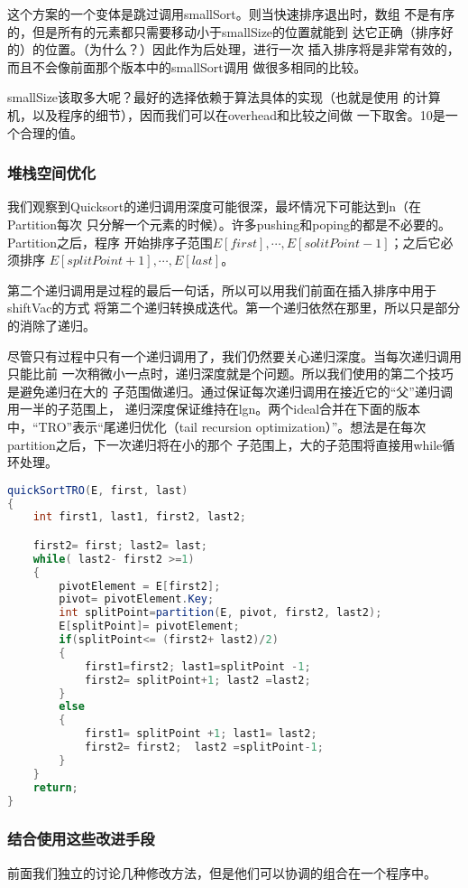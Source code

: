 这个方案的一个变体是跳过调用smallSort。则当快速排序退出时，数组
不是有序的，但是所有的元素都只需要移动小于smallSize的位置就能到
达它正确（排序好的）的位置。（为什么？）因此作为后处理，进行一次
插入排序将是非常有效的，而且不会像前面那个版本中的smallSort调用
做很多相同的比较。

smallSize该取多大呢？最好的选择依赖于算法具体的实现（也就是使用
的计算机，以及程序的细节），因而我们可以在overhead和比较之间做
一下取舍。10是一个合理的值。

\subsubsection{堆栈空间优化}
我们观察到Quicksort的递归调用深度可能很深，最坏情况下可能达到n（在Partition每次
只分解一个元素的时候）。许多pushing和poping的都是不必要的。Partition之后，程序
开始排序子范围$E[first], \cdots, E[solitPoint-1]$；之后它必须排序
$E[splitPoint+1], \cdots, E[last]$。

第二个递归调用是过程的最后一句话，所以可以用我们前面在插入排序中用于shiftVac的方式
将第二个递归转换成迭代。第一个递归依然在那里，所以只是部分的消除了递归。

尽管只有过程中只有一个递归调用了，我们仍然要关心递归深度。当每次递归调用只能比前
一次稍微小一点时，递归深度就是个问题。所以我们使用的第二个技巧是避免递归在大的
子范围做递归。通过保证每次递归调用在接近它的“父”递归调用一半的子范围上，
递归深度保证维持在lgn。两个ideal合并在下面的版本中，“TRO”表示“尾递归优化（tail
recursion optimization）”。想法是在每次partition之后，下一次递归将在小的那个
子范围上，大的子范围将直接用while循环处理。

\begin{lstlisting}[language={Java}, keywordstyle=\color{blue!70}, commentstyle=\color{red!50!green!50!blue!50}]
quickSortTRO(E, first, last)
{
    int first1, last1, first2, last2;

    first2= first; last2= last;
    while( last2- first2 >=1)
    {
        pivotElement = E[first2];
        pivot= pivotElement.Key;
        int splitPoint=partition(E, pivot, first2, last2);
        E[splitPoint]= pivotElement;
        if(splitPoint<= (first2+ last2)/2)
        {
            first1=first2; last1=splitPoint -1;
            first2= splitPoint+1; last2 =last2;
        }
        else
        {
            first1= splitPoint +1; last1= last2;
            first2= first2;  last2 =splitPoint-1;
        }
    }
    return;
}
\end{lstlisting}

\subsubsection{结合使用这些改进手段}
前面我们独立的讨论几种修改方法，但是他们可以协调的组合在一个程序中。

